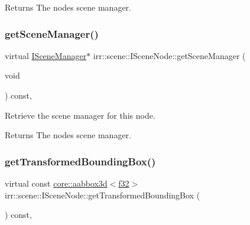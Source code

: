 \begin{DoxyReturn}{Returns}
The node\textquotesingle{}s scene manager. 
\end{DoxyReturn}
\mbox{\label{classirr_1_1scene_1_1ISceneNode_a394f112e9b4a1c66f7d58e873a3f8a1d}} 
\subsubsection{\texorpdfstring{get\+Scene\+Manager()}{getSceneManager()}\hspace{0.1cm}{\footnotesize\ttfamily [2/2]}}
{\footnotesize\ttfamily virtual \hyperlink{classirr_1_1scene_1_1ISceneManager}{I\+Scene\+Manager}$\ast$ irr\+::scene\+::\+I\+Scene\+Node\+::get\+Scene\+Manager (\begin{DoxyParamCaption}\item[{void}]{ }\end{DoxyParamCaption}) const\hspace{0.3cm}{\ttfamily [inline]}, {\ttfamily [virtual]}}



Retrieve the scene manager for this node. 

\begin{DoxyReturn}{Returns}
The node\textquotesingle{}s scene manager. 
\end{DoxyReturn}
\mbox{\label{classirr_1_1scene_1_1ISceneNode_a77746edcc479107067fbf1f4471ab412}} 
\subsubsection{\texorpdfstring{get\+Transformed\+Bounding\+Box()}{getTransformedBoundingBox()}\hspace{0.1cm}{\footnotesize\ttfamily [1/2]}}
{\footnotesize\ttfamily virtual const \hyperlink{classirr_1_1core_1_1aabbox3d}{core\+::aabbox3d}$<$\hyperlink{namespaceirr_a0277be98d67dc26ff93b1a6a1d086b07}{f32}$>$ irr\+::scene\+::\+I\+Scene\+Node\+::get\+Transformed\+Bounding\+Box (\begin{DoxyParamCaption}{ }\end{DoxyParamCaption}) const\hspace{0.3cm}{\ttfamily [inline]}, {\ttfamily [virtual]}}



